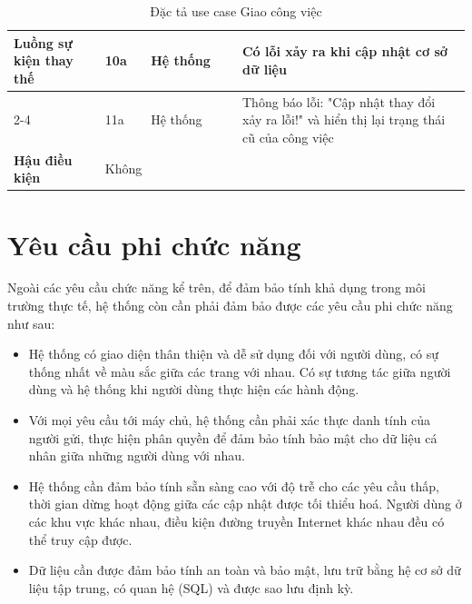\documentclass[../DoAn.tex]{subfiles}
\begin{document}
\begin{table}[ht]
\begin{tabular}{| p{0.2\linewidth} | p{0.1\linewidth} | p{0.2\linewidth} | p{0.5\linewidth} |}
        \multirow{4}{\linewidth}{\textbf{Luồng sự kiện thay thế}}    & \multicolumn{1}{p{0.1\linewidth}|}{10a}                                                            & \multicolumn{1}{p{0.2\linewidth}|}{Hệ thống}               & \multicolumn{1}{p{0.5\linewidth}|}{Có lỗi xảy ra khi cập nhật cơ sở dữ liệu}                                                   \\ \cline{2-4}
                                                                     & \multicolumn{1}{p{0.1\linewidth}|}{11a}                                                            & \multicolumn{1}{p{0.2\linewidth}|}{Hệ thống}               & \multicolumn{1}{p{0.5\linewidth}|}{Thông báo lỗi: "Cập nhật thay đổi xảy ra lỗi!" và hiển thị lại trạng thái cũ của công việc} \\ \hline

        \textbf{Hậu điều kiện}                                       & \multicolumn{3}{p{0.1\linewidth}|}{Không}                                                                                                                                                                                                                                                        \\ \hline
    \end{tabular}%
    \renewcommand{\arraystretch}{1}
    \caption{Đặc tả use case Giao công việc}
    \label{tab:UC04}
\end{table}

\newpage

\section{Yêu cầu phi chức năng}
\label{section:2.4}

Ngoài các yêu cầu chức năng kể trên, để đảm bảo tính khả dụng trong môi trường thực tế, hệ thống còn cần phải đảm bảo được các yêu cầu phi chức năng
như sau:

\begin{itemize}
    \item Hệ thống có giao diện thân thiện và dễ sử dụng đối với người dùng, có sự thống nhất về màu sắc giữa các trang với nhau.
          Có sự tương tác giữa người dùng và hệ thống khi người dùng thực hiện các hành động.
    \item Với mọi yêu cầu tới máy chủ, hệ thống cần phải xác thực danh tính của người gửi, thực hiện phân quyền để đảm bảo tính bảo mật cho
          dữ liệu cá nhân giữa những người dùng với nhau.
    \item Hệ thống cần đảm bảo tính sẵn sàng cao với độ trễ cho các yêu cầu thấp, thời gian dừng hoạt động giữa các cập nhật được tối thiểu hoá.
          Người dùng ở các khu vực khác nhau, điều kiện đường truyền Internet khác nhau đều có thể truy cập được.
    \item Dữ liệu cần được đảm bảo tính an toàn và bảo mật, lưu trữ bằng hệ cơ sở dữ liệu tập trung, có quan hệ (SQL) và được sao lưu định kỳ.
\end{itemize}

\end{document}

